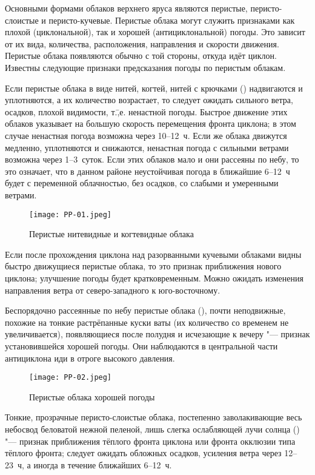Основными формами облаков верхнего яруса являются перистые,
перисто-слоистые и перисто-кучевые. Перистые облака могут служить
признаками как плохой (циклональной), так и хорошей (антициклональной)
погоды. Это зависит от их вида, количества, расположения, направления
и скорости движения. Перистые облака появляются обычно с той стороны,
откуда идёт циклон. Известны следующие признаки предсказания погоды по
перистым облакам.

 Если перистые облака в виде нитей, когтей, нитей с крючками
() надвигаются и уплотняются, а их количество возрастает,
то следует ожидать сильного ветра, осадков, плохой видимости,
т.\=,е. ненастной погоды. Быстрое движение этих облаков указывает на
большую скорость перемещения фронта циклона; в этом случае ненастная
погода возможна через 10--12~ч. Если же облака движутся медленно,
уплотняются и снижаются, ненастная погода с сильными ветрами возможна
через 1--3~суток. Если этих облаков мало и они рассеяны по небу,
то это означает, что в данном районе неустойчивая погода в ближайшие
6--12~ч будет с переменной облачностью, без осадков, со слабыми и
умеренными ветрами.

\begin{figure}[htb]
  \centering{}
  \texttt{[image: PP-01.jpeg]}
  \caption{Перистые нитевидные и когтевидные облака}
  \label{fig:pp01}
  \small
  \centering{}
\end{figure}

 Если после прохождения циклона над разорванными кучевыми
облаками видны быстро движущиеся перистые облака, то это признак
приближения нового циклона; улучшение погоды будет
кратковременным. Можно ожидать изменения направления ветра от
северо-западного к юго-восточному.

 Беспорядочно рассеянные по небу перистые облака (),
почти неподвижные, похожие на тонкие растрёпанные куски ваты (их
количество со временем не увеличивается), появляющиеся после полудня и
исчезающие к вечеру "--- признак установившейся хорошей погоды. Они
наблюдаются в центральной части антициклона иди в отроге высокого
давления.

\begin{figure}[htb]
  \centering{}
  \texttt{[image: PP-02.jpeg]}
  \caption{Перистые облака хорошей погоды}
  \label{fig:pp02}
  \small
  \centering{}
\end{figure}

 Тонкие, прозрачные перисто-слоистые облака, постепенно
заволакивающие весь небосвод беловатой нежной пеленой, лишь слегка
ослабляющей лучи солнца () "--- признак приближения тёплого
фронта циклона или фронта окклюзии
типа тёплого фронта; следует ожидать обложных
осадков, усиления ветра через 12--23~ч, а иногда в течение ближайших
6--12~ч.

